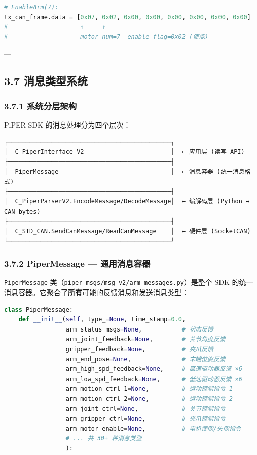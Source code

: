 \documentclass[UTF8,a4paper,11pt]{ctexart}
\begin{document}
\begin{lstlisting}[language=python]
# EnableArm(7):
tx_can_frame.data = [0x07, 0x02, 0x00, 0x00, 0x00, 0x00, 0x00, 0x00]
#                    ↑     ↑
#                    motor_num=7  enable_flag=0x02 (使能)
\end{lstlisting}

---

\subsection{3.7 消息类型系统}

\subsubsection{3.7.1 系统分层架构}

PiPER SDK 的消息处理分为四个层次：

\begin{lstlisting}[language=text]
┌─────────────────────────────────────────────┐
│  C_PiperInterface_V2                        │  ← 应用层 (读写 API)
├─────────────────────────────────────────────┤
│  PiperMessage                               │  ← 消息容器 (统一消息格式)
├─────────────────────────────────────────────┤
│  C_PiperParserV2.EncodeMessage/DecodeMessage│  ← 编解码层 (Python ↔ CAN bytes)
├─────────────────────────────────────────────┤
│  C_STD_CAN.SendCanMessage/ReadCanMessage    │  ← 硬件层 (SocketCAN)
└─────────────────────────────────────────────┘
\end{lstlisting}

\subsubsection{3.7.2 PiperMessage — 通用消息容器}

\texttt{PiperMessage} 类（\texttt{piper_msgs/msg_v2/arm_messages.py}）是整个 SDK 的统一消息容器。它聚合了\textbf{所有}可能的反馈消息和发送消息类型：

\begin{lstlisting}[language=python]
class PiperMessage:
    def __init__(self, type_=None, time_stamp=0.0,
                 arm_status_msgs=None,           # 状态反馈
                 arm_joint_feedback=None,        # 关节角度反馈
                 gripper_feedback=None,          # 夹爪反馈
                 arm_end_pose=None,              # 末端位姿反馈
                 arm_high_spd_feedback=None,     # 高速驱动器反馈 ×6
                 arm_low_spd_feedback=None,      # 低速驱动器反馈 ×6
                 arm_motion_ctrl_1=None,         # 运动控制指令 1
                 arm_motion_ctrl_2=None,         # 运动控制指令 2
                 arm_joint_ctrl=None,            # 关节控制指令
                 arm_gripper_ctrl=None,          # 夹爪控制指令
                 arm_motor_enable=None,          # 电机使能/失能指令
                 # ... 共 30+ 种消息类型
                 ):
\end{lstlisting}
\end{document}
